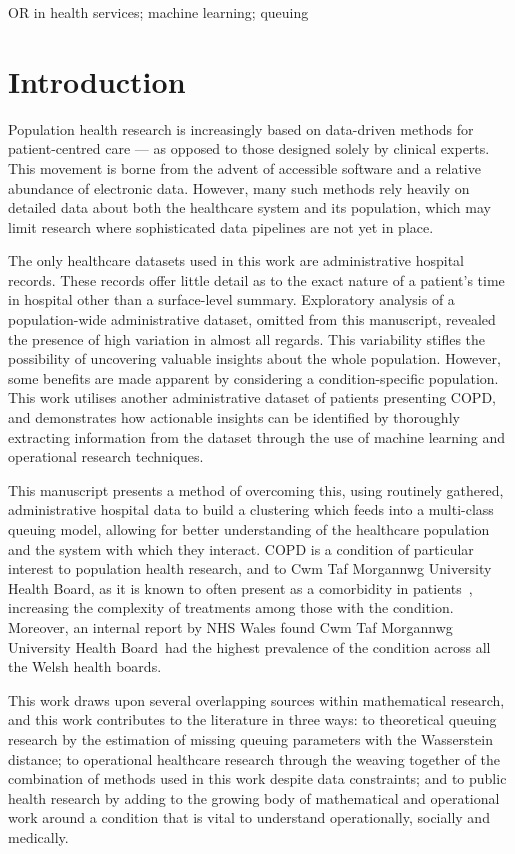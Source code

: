 \documentclass[]{interact}
\theoremstyle{plain}%
\theoremstyle{definition}
\theoremstyle{remark}
\newcommand{\ctmuhb}{Cwm Taf Morgannwg University Health Board}
\begin{document}
\begin{keywords}
OR in health services; machine learning; queuing
\end{keywords}


\section{Introduction}\label{sec:intro}

Population health research is increasingly based on data-driven methods for
patient-centred care --- as opposed to those designed solely by clinical
experts. This movement is borne from the advent of accessible software and a
relative abundance of electronic data. However, many such methods rely heavily
on detailed data about both the healthcare system and its population, which may
limit research where sophisticated data pipelines are not yet in place.

The only healthcare datasets used in this work are administrative hospital
records. These records offer little detail as to the exact nature of a patient's
time in hospital other than a surface-level summary. Exploratory analysis of a
population-wide administrative dataset, omitted from this manuscript, revealed
the presence of high variation in almost all regards. This variability stifles
the possibility of uncovering valuable insights about the whole population.
However, some benefits are made apparent by considering a condition-specific
population. This work utilises another administrative dataset of patients
presenting COPD, and demonstrates how actionable insights can be identified by
thoroughly extracting information from the dataset through the use of machine
learning and operational research techniques.

This manuscript presents a method of overcoming this, using routinely gathered,
administrative hospital data to build a clustering which feeds into a
multi-class queuing model, allowing for better understanding of the healthcare
population and the system with which they interact. COPD is a condition of
particular interest to population health research, and to \ctmuhb, as it is
known to often present as a comorbidity in patients~\citep{Houben2019},
increasing the complexity of treatments among those with the condition.
Moreover, an internal report by NHS Wales found \ctmuhb\ had the highest
prevalence of the condition across all the Welsh health boards.

This work draws upon several overlapping sources within mathematical research,
and this work contributes to the literature in three ways: to theoretical
queuing research by the estimation of missing queuing parameters with the
Wasserstein distance; to operational healthcare research through the weaving
together of the combination of methods used in this work despite data
constraints; and to public health research by adding to the growing body of
mathematical and operational work around a condition that is vital to understand
operationally, socially and medically.
\end{document}
